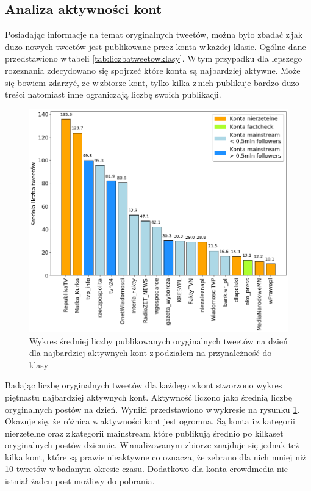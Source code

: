 \subsection{Analiza aktywności kont}
Posiadając informacje na temat oryginalnych tweetów, można było zbadać z\,jak duzo nowych tweetów jest publikowane przez konta w\,każdej klasie. Ogólne dane przedstawiono w\,tabeli \ref{tab:liczbatweetowklasy}. W\,tym przypadku dla lepszego rozeznania zdecydowano się spojrzeć które konta są najbardziej aktywne. Może się bowiem zdarzyć, że w\,zbiorze kont, tylko kilka z\,nich publikuje bardzo duzo treści natomiast inne ograniczają liczbę swoich publikacji. 
\par
\begin{figure}[!h]
	\centering \includegraphics[width=0.9\linewidth]{img/results/tweetsperday.png}
	\caption{Wykres średniej liczby publikowanych oryginalnych tweetów na dzień dla najbardziej aktywnych kont z\,podziałem na przynależność do klasy} \label{fig:tweetsperday}
\end{figure}
\par
Badając liczbę oryginalnych tweetów dla każdego z\,kont stworzono wykres piętnastu najbardziej aktywnych kont. Aktywność liczono jako średnią liczbę oryginalnych postów na dzień. Wyniki przedstawiono w\,wykresie na rysunku \ref{fig:tweetsperday}. Okazuje się, że różnica w\,aktywności kont jest ogromna. Są konta i\,z kategorii nierzetelne oraz z\,kategorii mainstream które publikują średnio po kilkaset oryginalnych postów dziennie. W\,analizowanym zbiorze znajduje się jednak też kilka kont, które są prawie nieaktywne co oznacza, że zebrano dla nich mniej niż 10 tweetów w\,badanym okresie czasu. Dodatkowo dla konta crowdmedia nie istniał żaden post możliwy do pobrania.